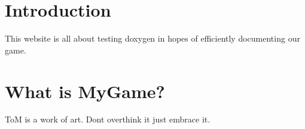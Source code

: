 \hypertarget{index_intro_sec}{}\section{Introduction}\label{index_intro_sec}
This website is all about testing doxygen in hopes of efficiently documenting our game.\hypertarget{index_whatis_rec}{}\section{What is My\+Game?}\label{index_whatis_rec}
ToM is a work of art. Don\textquotesingle{}t overthink it just embrace it. 